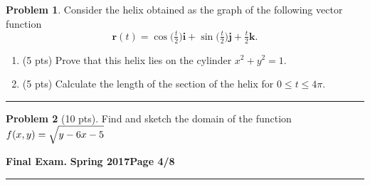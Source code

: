 \documentclass[12pt]{article}
\theoremstyle{definition}
\newtheorem{problem}{Problem}
\begin{document}
\bigskip
\begin{problem}
Consider the helix obtained as the graph of the following vector function 
\begin{equation*}
\boldsymbol{r}(t) = \cos \big(\tfrac{t}{2}\big) \boldsymbol{i} + \sin \big( \tfrac{t}{2} \big) \boldsymbol{j} +\tfrac{t}{2} \boldsymbol{k}.
\end{equation*}
\begin{enumerate}
  \item (5 pts) Prove that this helix lies on the cylinder $x^2+y^2=1$.
  \vspace{3cm}
  \item (5 pts) Calculate the length of the section of the helix for $0 \leq t \leq 4\pi$.
  \vspace{4cm}
  \begin{flushright}
  \end{flushright}
\end{enumerate}
\end{problem}
\hrule
\begin{problem}[10 pts]
Find and sketch the domain of the function $f(x,y) = \sqrt{\strut y-6x-5}$

\vspace{1cm}
\vspace{1cm}  
\begin{flushright}
\end{flushright}
\end{problem}
\newpage

\hfill{\large\bf Final Exam.}\hfill{\large\bf
  Spring 2017}\hfill{\large\bf Page 4/8}\hrule
\end{document}

